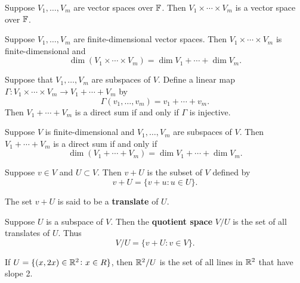 \documentclass{extarticle}
\begin{document}
\begin{thm}
    Suppose \(V_1, \ldots, V_m\) are vector spaces over \(\mathbb{F}\). Then \(V_1 \times \cdots \times V_m\)
    is a vector space over \(\mathbb{F}\). 
\end{thm}


\begin{thm}
    Suppose \(V_1, \ldots, V_m\) are finite-dimensional vector spaces. Then \(V_1 \times \cdots \times 
    V_m\) is finite-dimensional and 
    \[\dim (V_1 \times \cdots \times V_m) = \dim V_1 + \cdots + \dim V_m.\]
\end{thm}


\begin{lemma}
    Suppose that \(V_1, \ldots, V_m\) are subspaces of \(V\). Define a linear map \(\Gamma \colon 
    V_1 \times \cdots \times V_m \to V_1 + \cdots + V_m \) by
    \[\Gamma (v_1, \ldots, v_m) = v_1 + \cdots + v_m.\]
    Then \(V_1 + \cdots + V_m\) is a direct sum if and only if \(\Gamma\) is injective. 
\end{lemma}

\begin{thm}
    Suppose \(V\) is finite-dimensional and \(V_1, \ldots, V_m\) are subspaces of \(V\). Then 
    \(V_1 + \cdots + V_m\) is a direct sum if and only if 
    \[\dim(V_1 + \cdots + V_m) = \dim V_1 + \cdots + \dim V_m.\]
\end{thm}


\begin{definition}[\(v + U\), translation]
    Suppose \(v \in V\) and \(U \subset V\). Then \(v + U\) is the subset of \(V\) defined by 
    \[v + U = \{v + u \colon  u \in U\}.\]

    The set \(v + U\) is said to be a \textbf{translate} of \(U\).
\end{definition}


\begin{definition}
    Suppose \(U\) is a subspace of \(V\). Then the \textbf{quotient space} \(V / U\) is the set of 
    all translates of \(U\). Thus 
    \[V / U = \{v + U \colon v \in V\}.\]
\end{definition}

\begin{remark}
    If \(U = \{(x, 2x) \in \mathbb{R}^2 \colon x \in R\}\), then \(\mathbb{R}^2 / U\) is the set of all lines in 
    \(\mathbb{R}^2\) that have slope 2. 
\end{remark}
\end{document}
